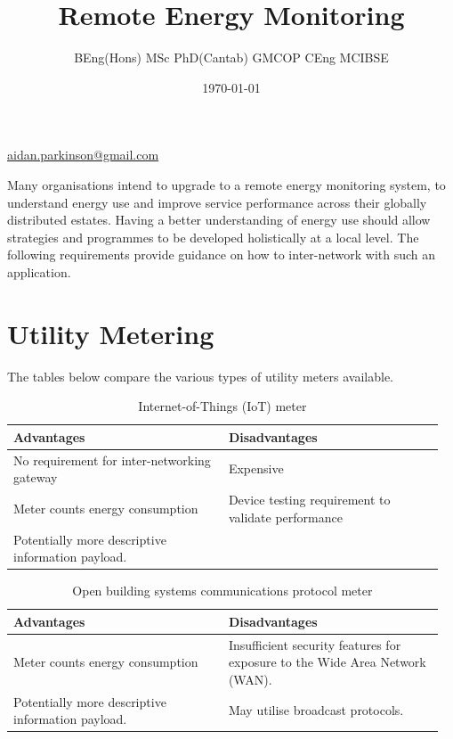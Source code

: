 \documentclass[11pt, oneside]{article}   	%
\title{Remote Energy Monitoring}
\author{BEng(Hons) MSc PhD(Cantab) GMCOP CEng MCIBSE}
\date{\today}							%
\begin{document}
\maketitle
\begin{center}
\href{mailto:aidan.parkinson@gmail.com}{aidan.parkinson@gmail.com}
\end{center}

Many organisations intend to upgrade to a remote energy monitoring system, to understand energy use and improve service performance across their globally distributed estates.
Having a better understanding of energy use should allow strategies and programmes to be developed holistically at a local level.
The following requirements provide guidance on how to inter-network with such an application.

\section{Utility Metering}

The tables below compare the various types of utility meters available.

\begin{table}[h!]
	\caption{Internet-of-Things (IoT) meter}
	\begin{center}
	\begin{tabular}{p{0.48\linewidth} | p{0.48\linewidth}}
	\hline
	Advantages&Disadvantages\\
	\hline
	No requirement for inter-networking gateway&Expensive\\
	Meter counts energy consumption&Device testing requirement to validate performance\\
	Potentially more descriptive information payload.\\
	\end{tabular}
	\end{center}
	\label{IoT Meter Option}
\end{table}

\begin{table}[h!]
	\caption{Open building systems communications protocol meter}
	\begin{center}
	\begin{tabular}{p{0.48\linewidth} | p{0.48\linewidth}}
	\hline
	Advantages&Disadvantages\\
	\hline
	Meter counts energy consumption&Insufficient security features for exposure to the Wide Area Network (WAN).\\
	Potentially more descriptive information payload.&May utilise broadcast protocols.\\
	\end{tabular}
	\end{center}
	\label{Open Protocol Meter Option}
\end{table}
\end{document}
